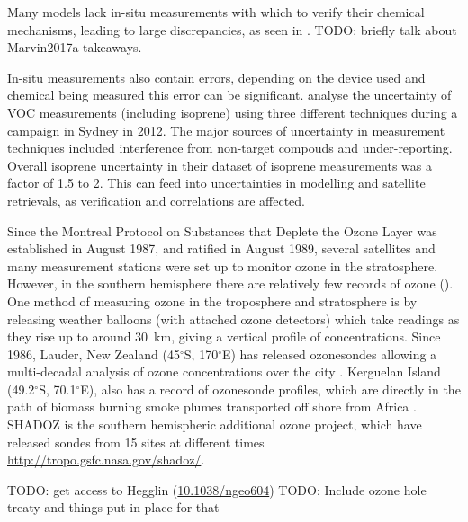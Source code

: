       Many models lack in-situ measurements with which to verify their chemical mechanisms, leading to large discrepancies, as seen in \cite{Marvin2017a}.
      TODO: briefly talk about Marvin2017a takeaways.
      
      In-situ measurements also contain errors, depending on the device used and chemical being measured this error can be significant.
      \cite{Dunne2017} analyse the uncertainty of VOC measurements (including isoprene) using three different techniques during a campaign in Sydney in 2012.
      The major sources of uncertainty in measurement techniques included interference from non-target compouds and under-reporting.
      Overall isoprene uncertainty in their dataset of isoprene measurements was a factor of 1.5 to 2.
      This can feed into uncertainties in modelling and satellite retrievals, as verification and correlations are affected.
      
      Since the Montreal Protocol on Substances that Deplete the Ozone Layer was established in August 1987, and ratified in August 1989, several satellites and many measurement stations were set up to monitor ozone in the stratosphere.
      However, in the southern hemisphere there are relatively few records of ozone (\cite{Huang2017}).
      One method of measuring ozone in the troposphere and stratosphere is by releasing weather balloons (with attached ozone detectors) which take readings as they rise up to around 30~km, giving a vertical profile of concentrations.
      Since 1986, Lauder, New Zealand (45$^{\circ}$S, 170$^{\circ}$E) has released ozonesondes allowing a multi-decadal analysis of ozone concentrations over the city \citep{Brinksma2002}.
      Kerguelan Island (49.2$^{\circ}$S, 70.1$^{\circ}$E), also has a record of ozonesonde profiles, which are directly in the path of biomass burning smoke plumes transported off shore from Africa \citep{Baray2012}.
      SHADOZ is the southern hemispheric additional ozone project, which have released sondes from 15 sites at different times \url{http://tropo.gsfc.nasa.gov/shadoz/}.
      
      
      TODO: get access to Hegglin (\url{10.1038/ngeo604}) \citep{Hegglin2009}
      TODO: Include ozone hole treaty and things put in place for that
      

